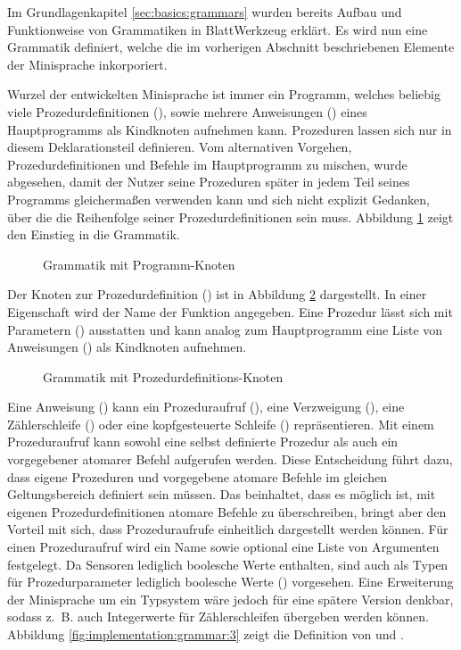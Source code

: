 Im Grundlagenkapitel \ref{sec:basics:grammars} wurden bereits Aufbau und Funktionweise von Grammatiken in BlattWerkzeug erklärt. Es wird nun eine Grammatik definiert, welche die im vorherigen Abschnitt beschriebenen Elemente der Minisprache inkorporiert.

Wurzel der entwickelten Minisprache ist immer ein Programm, welches beliebig viele Prozedurdefinitionen (), sowie mehrere Anweisungen () eines Hauptprogramms als Kindknoten aufnehmen kann. Prozeduren lassen sich nur in diesem Deklarationsteil definieren. Vom alternativen Vorgehen, Prozedurdefinitionen und Befehle im Hauptprogramm zu mischen, wurde abgesehen, damit der Nutzer seine Prozeduren später in jedem Teil seines Programms gleichermaßen verwenden kann und sich nicht explizit Gedanken, über die die Reihenfolge seiner Prozedurdefinitionen sein muss. Abbildung \ref{fig:implementation:grammar:1} zeigt den Einstieg in die Grammatik.

\begin{figure}[h]
  
  \caption{Grammatik mit Programm-Knoten}
  \label{fig:implementation:grammar:1}
\end{figure}

Der Knoten zur Prozedurdefinition () ist in Abbildung \ref{fig:implementation:grammar:2} dargestellt. In  einer Eigenschaft wird der Name der Funktion angegeben. Eine Prozedur lässt sich mit Parametern () ausstatten und kann analog zum Hauptprogramm eine Liste von Anweisungen () als Kindknoten aufnehmen.

\begin{figure}[h]
  
  \caption{Grammatik mit Prozedurdefinitions-Knoten}
  \label{fig:implementation:grammar:2}
\end{figure}

Eine Anweisung () kann ein Prozeduraufruf (), eine Verzweigung (), eine Zählerschleife () oder eine kopfgesteuerte Schleife () repräsentieren. Mit einem Prozeduraufruf kann sowohl eine selbst definierte Prozedur als auch ein vorgegebener atomarer Befehl aufgerufen werden. Diese Entscheidung führt dazu, dass eigene Prozeduren und vorgegebene atomare Befehle im gleichen Geltungsbereich definiert sein müssen. Das beinhaltet, dass es möglich ist, mit eigenen Prozedurdefinitionen atomare Befehle zu überschreiben, bringt aber den Vorteil mit sich, dass Prozeduraufrufe einheitlich dargestellt werden können. Für einen Prozeduraufruf wird ein Name sowie optional eine Liste von Argumenten festgelegt. Da Sensoren lediglich boolesche Werte enthalten, sind auch als Typen für Prozedurparameter lediglich boolesche Werte () vorgesehen. Eine Erweiterung der Minisprache um ein Typsystem wäre jedoch für eine spätere Version denkbar, sodass z.~B. auch Integerwerte für Zählerschleifen übergeben werden können. Abbildung \ref{fig:implementation:grammar:3} zeigt die Definition von  und .

